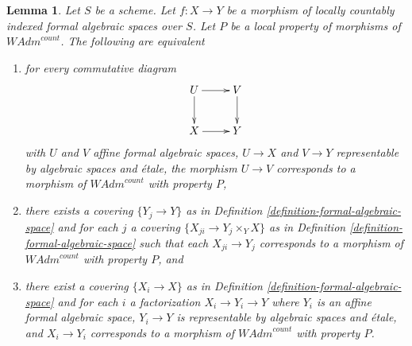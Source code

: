 \documentclass{stacks-project}
\theoremstyle{plain}
\newtheorem{lemma}[subsection]{Lemma}
\theoremstyle{definition}
\theoremstyle{remark}
\numberwithin{equation}{subsection}
\begin{document}
\begin{lemma}
\label{lemma-property-defines-property-morphisms}
Let $S$ be a scheme. Let $f : X \to Y$ be a morphism of
locally countably indexed formal algebraic spaces over $S$.
Let $P$ be a local property of morphisms of $\textit{WAdm}^{count}$.
The following are equivalent
\begin{enumerate}
\item for every commutative diagram
$$
\xymatrix{
U \ar[d] \ar[r] & V \ar[d] \\
X \ar[r] & Y
}
$$
with $U$ and $V$ affine formal algebraic spaces, $U \to X$ and $V \to Y$
representable by algebraic spaces and \'etale, the morphism $U \to V$
corresponds to a morphism of $\textit{WAdm}^{count}$ with property $P$,
\item there exists a covering $\{Y_j \to Y\}$ as in
Definition \ref{definition-formal-algebraic-space} and for each $j$
a covering $\{X_{ji} \to Y_j \times_Y X\}$ as in
Definition \ref{definition-formal-algebraic-space}
such that each $X_{ji} \to Y_j$  corresponds
to a morphism of $\textit{WAdm}^{count}$ with property $P$, and
\item there exist a covering $\{X_i \to X\}$ as in
Definition \ref{definition-formal-algebraic-space}
and for each $i$ a factorization $X_i \to Y_i \to Y$ where $Y_i$
is an affine formal algebraic space, $Y_i \to Y$ is representable
by algebraic spaces and \'etale, and $X_i \to Y_i$ corresponds
to a morphism of $\textit{WAdm}^{count}$ with property $P$.
\end{enumerate}
\end{lemma}
\end{document}
